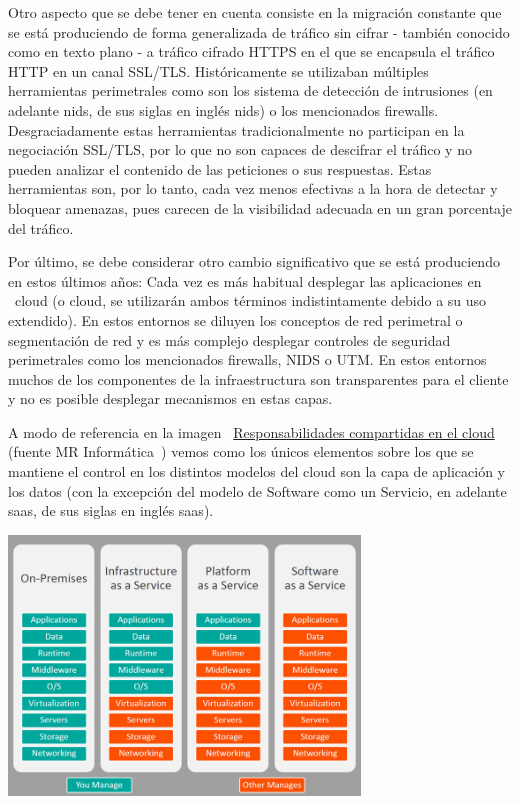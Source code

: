 \par Otro aspecto que se debe tener en cuenta consiste en la migración constante que se está produciendo de forma generalizada de tráfico sin cifrar - también conocido como en texto plano - a tráfico cifrado HTTPS en el que se
encapsula el tráfico HTTP en un canal SSL/TLS. Históricamente se utilizaban múltiples herramientas perimetrales como son los sistema de detección de intrusiones (en adelante \acrshort{nids}, de sus siglas en inglés \acrlong{nids}) o los
mencionados firewalls. Desgraciadamente estas herramientas tradicionalmente no participan en la negociación SSL/TLS, por lo que no son capaces de descifrar el tráfico y no pueden analizar el contenido de las peticiones o sus respuestas. Estas
herramientas son, por lo tanto, cada vez menos efectivas a la hora de detectar y bloquear amenazas, pues carecen de la visibilidad adecuada en un gran porcentaje del tráfico.
\par Por último, se debe considerar otro cambio significativo que se está produciendo en estos últimos años: Cada vez es más habitual desplegar las aplicaciones en ~\gls{cloud} (o cloud, se utilizarán ambos términos indistintamente
debido a su uso extendido). En estos entornos se diluyen los conceptos de red perimetral o segmentación de red y es más complejo desplegar controles de seguridad perimetrales como los mencionados firewalls, NIDS o UTM. En estos entornos muchos
de los componentes de la infraestructura son transparentes para el cliente y no es posible desplegar mecanismos en estas capas.
\par A modo de referencia en la imagen {~\hyperref[fig:Responsabilidadescloud]{Responsabilidades compartidas en el cloud}} (fuente MR Informática~\cite{Responsabilidadescloud}) vemos como los únicos elementos sobre los que se mantiene el
control en los distintos modelos del cloud son la capa de aplicación y los datos (con la excepción del modelo de Software como un Servicio, en adelante \acrshort{saas}, de sus siglas en inglés \acrlong{saas}).
\begin{center}
  \label{fig:Responsabilidadescloud}
  \includegraphics[width=0.7\textwidth]{fig/Responsabilidadescloud}
\end{center}

